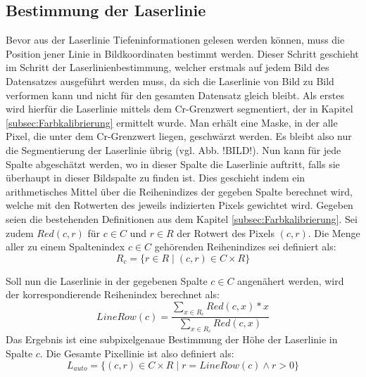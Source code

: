 \subsection{Bestimmung der Laserlinie}
\label{subsec:LaserLinieBestimmung}
Bevor aus der Laserlinie Tiefeninformationen gelesen werden können, muss die Position jener Linie in Bildkoordinaten bestimmt werden. Dieser Schritt geschieht im Schritt der Laserlinienbestimmung, welcher erstmals auf jedem Bild des Datensatzes ausgeführt werden muss, da sich die Laserlinie von Bild zu Bild verformen kann und nicht für den gesamten Datensatz gleich bleibt. Als erstes wird hierfür die Laserlinie mittels dem Cr-Grenzwert segmentiert, der in Kapitel \ref{subsec:Farbkalibrierung} ermittelt wurde. Man erhält eine Maske, in der alle Pixel, die unter dem Cr-Grenzwert liegen, geschwärzt werden. Es bleibt also nur die Segmentierung der Laserlinie übrig (vgl. Abb. !BILD!). Nun kann für jede Spalte abgeschätzt werden, wo in dieser Spalte die Laserlinie auftritt, falls sie überhaupt in dieser Bildspalte zu finden ist. Dies geschieht indem ein arithmetisches Mittel über die Reihenindizes der gegeben Spalte berechnet wird, welche mit den Rotwerten des jeweils indizierten Pixels gewichtet wird. Gegeben seien die bestehenden Definitionen aus dem Kapitel \ref{subsec:Farbkalibrierung}. Sei zudem \(Red(c,r)\) für \(c \in C\) und \(r \in R\) der Rotwert des Pixels \((c,r)\). Die Menge aller zu einem Spaltenindex \(c \in C\) gehörenden Reihenindizes sei definiert als:
\begin{equation}
R_{c} = \lbrace r \in R \mid (c, r) \in C \times R \rbrace
\end{equation}

 Soll nun die Laserlinie in der gegebenen Spalte \(c \in C\) angenähert werden, wird der korrespondierende Reihenindex berechnet als:
\begin{equation}
LineRow(c) = \frac{\sum_{x \in R_{c}} Red(c,x) * x}{\sum_{x \in R_{c}} Red(c,x)}
\end{equation}
Das Ergebnis ist eine subpixelgenaue Bestimmung der Höhe der Laserlinie in Spalte \(c\). Die Gesamte Pixellinie ist also definiert als: 
\begin{equation}
L_{auto} = \lbrace (c,r) \in C \times R \mid r = LineRow(c) \wedge r > 0 \rbrace
\end{equation} 

